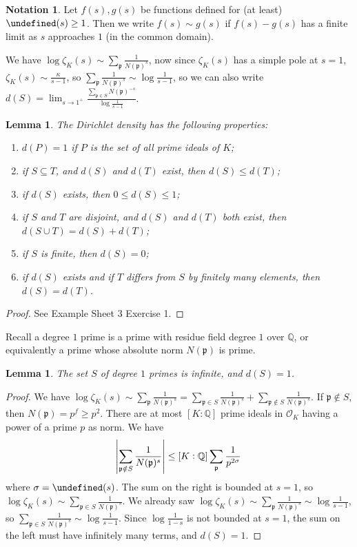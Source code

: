 \documentclass[11pt]{article}
\theoremstyle{definition}
\newtheorem{notation}[definition]{Notation}
\theoremstyle{plain}
\newtheorem{lemma}[definition]{Lemma}
\theoremstyle{remark}
\let\Re\undefined
\DeclareMathOperator{\Re}{Re}
\newcommand{\QQ}{\mathbb{Q}}
\newcommand{\cO}{\mathcal{O}}
\newcommand{\fp}{\mathfrak{p}}
\begin{document}
\begin{notation}\label{not:8_2}
    Let $f(s), g(s)$ be functions defined for (at least) $\Re(s) \ge 1$. Then we write $f(s) \sim g(s)$ if $f(s) - g(s)$ has a finite limit as $s$ approaches $1$ (in the common domain).
\end{notation}

We have $\log \zeta_K(s) \sim \sum_{\fp} \frac{1}{N(\fp)^s}$, now since $\zeta_K(s)$ has a simple pole at $s=1$, $\zeta_K(s) \sim \frac{\kappa}{s-1}$, so $\sum_{\fp} \frac{1}{N(\fp)^s} \sim \log \frac{1}{s-1}$, so we can also write $d(S) = \lim_{s \to 1^+} \frac{\sum_{\fp \in S} N(\fp)^{-s}}{\log \frac{1}{s-1}}$.

\begin{lemma}\label{lem:8_3}
    The Dirichlet density has the following properties:
    \begin{enumerate}[label=\roman*)]
        \item $d(P) = 1$ if $P$ is the set of all prime ideals of $K$;
        \item if $S \subseteq T$, and $d(S)$ and $d(T)$ exist, then $d(S) \le d(T)$;
        \item if $d(S)$ exists, then $0 \le d(S) \le 1$;
        \item if $S$ and $T$ are disjoint, and $d(S)$ and $d(T)$ both exist, then $d(S \cup T) = d(S) + d(T)$;
        \item if $S$ is finite, then $d(S) = 0$;
        \item if $d(S)$ exists and if $T$ differs from $S$ by finitely many elements, then $d(S) = d(T)$.
    \end{enumerate}
\end{lemma}
\begin{proof}
    See Example Sheet 3 Exercise 1.
\end{proof}

Recall a degree $1$ prime is a prime with residue field degree $1$ over $\QQ$, or equivalently a prime whose absolute norm $N(\fp)$ is prime.

\begin{lemma}\label{lem:8_4}
    The set $S$ of degree $1$ primes is infinite, and $d(S) = 1$.
\end{lemma}
\begin{proof}
    We have $\log \zeta_K(s) \sim \sum_{\fp} \frac{1}{N(\fp)^s} = \sum_{\fp \in S} \frac{1}{N(\fp)^s} + \sum_{\fp \notin S} \frac{1}{N(\fp)^s}$. If $\fp \notin S$, then $N(\fp) = p^f \ge p^2$. There are at most $[K : \QQ]$ prime ideals in $\cO_K$ having a power of a prime $p$ as norm. We have
    \begin{equation*}
        \abs{\sum_{\fp \notin S} \frac{1}{N(\fp)^s}} \le [K : \QQ] \sum_{\fp} \frac{1}{p^{2 \sigma}}
    \end{equation*}
    where $\sigma = \Re(s)$. The sum on the right is bounded at $s = 1$, so $\log \zeta_K(s) \sim \sum_{\fp \in S} \frac{1}{N(\fp)^s}$. We already saw $\log \zeta_K(s) \sim \sum_{\fp} \frac{1}{N(\fp)^s} \sim \log \frac{1}{s-1}$, so $\sum_{\fp \in S} \frac{1}{N(\fp)^s} \sim \log \frac{1}{s-1}$. Since $\log \frac{1}{1-s}$ is not bounded at $s=1$, the sum on the left must have infinitely many terms, and $d(S) = 1$.
\end{proof}
\end{document}
